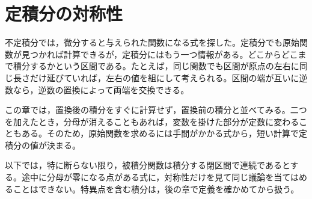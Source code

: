 \chapter{定積分の対称性}\label{章:定積分の対称性}

不定積分では，微分すると与えられた関数になる式を探した。定積分でも原始関数が見つかれば計算できるが，定積分にはもう一つ情報がある。どこからどこまで積分するかという区間である。たとえば，同じ関数でも区間が原点の左右に同じ長さだけ延びていれば，左右の値を組にして考えられる。区間の端が互いに逆数なら，逆数の置換によって両端を交換できる。

この章では，置換後の積分をすぐに計算せず，置換前の積分と並べてみる。二つを加えたとき，分母が消えることもあれば，変数を掛けた部分が定数に変わることもある。そのため，原始関数を求めるには手間がかかる式から，短い計算で定積分の値が決まる。

以下では，特に断らない限り，被積分関数は積分する閉区間で連続であるとする。途中に分母が零になる点がある式に，対称性だけを見て同じ議論を当てはめることはできない。特異点を含む積分は，後の章で定義を確かめてから扱う。

%
%
%
%
%
%
%
%
